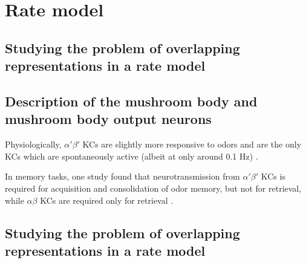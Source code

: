 
  \section{Rate model} 

\subsection*{ Studying the problem of overlapping representations in a rate model}

\subsection*{ Description of the mushroom body and mushroom body output neurons}
Physiologically, $\alpha'\beta'$ KCs are slightly more responsive to odors and are the only KCs which are spontaneously active (albeit at only around 0.1 Hz) \cite{18094099}.

In memory tasks, one study found that neurotransmission from $\alpha'\beta'$ KCs is required for acquisition and consolidation of odor memory, but not for retrieval, while $\alpha\beta$ KCs are required only for retrieval \cite{17196534}.

\subsection*{ Studying the problem of overlapping representations in a rate model}
  
  
  
  
  
  
  
  
  
  
